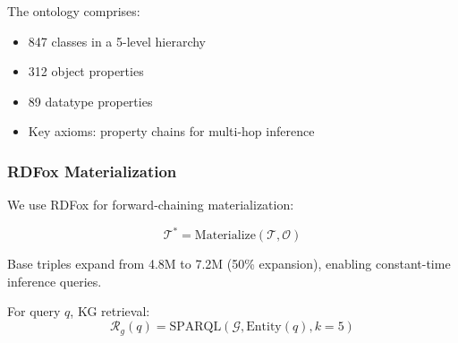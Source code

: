 \documentclass[10pt,twocolumn]{article}
\begin{document}
The ontology comprises:
\begin{itemize}
    \item 847 classes in a 5-level hierarchy
    \item 312 object properties
    \item 89 datatype properties
    \item Key axioms: property chains for multi-hop inference
\end{itemize}

\subsubsection{RDFox Materialization}

We use RDFox \cite{rdfox2023} for forward-chaining materialization:

\begin{equation}
\mathcal{T}^* = \text{Materialize}(\mathcal{T}, \mathcal{O})
\end{equation}

Base triples expand from 4.8M to 7.2M (50\% expansion), enabling constant-time inference queries.

For query $q$, KG retrieval:
\begin{equation}
\mathcal{R}_g(q) = \text{SPARQL}(\mathcal{G}, \text{Entity}(q), k=5)
\end{equation}
\end{document}
